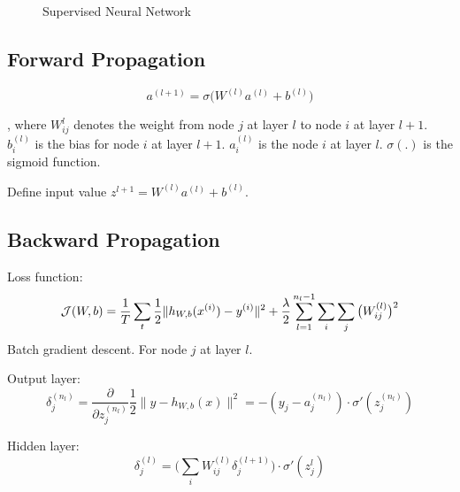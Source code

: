 \documentclass[a4paper]{report}
\begin{document}
\begin{figure}[!htp]
\centering
{}
\caption{Supervised Neural Network}
\label{fig:nnBasic}
\end{figure}

\subsection{Forward Propagation}

$$
a^{(l+1)} = \sigma\Big(W^{(l)}a^{(l)}+b^{(l)}\Big)
$$

, where $W_{ij}^{l}$ denotes the weight from node $j$ at layer $l$ to node $i$ at layer $l+1$. $b_i^{(l)}$ is the bias for node $i$ at layer $l+1$. $a_i^{(l)}$ is the node $i$ at layer $l$. $\sigma(.)$ is the sigmoid function. 

Define input value $z^{l+1} = W^{(l)}a^{(l)}+b^{(l)}$.

\subsection{Backward Propagation}
Loss function:
\begin{align*}
\mathcal{J}(W,b) = \frac{1}{T} \sum_{t} \frac{1}{2} \| h_{W,b}(x^{(i)})-y^{(i)}\|^2+\frac{\lambda}{2} \sum_{l=1}^{n_l-1} \sum_i \sum_j \big(W_{ij}^{(l)}\big)^2
\end{align*}
Batch gradient descent. For node $j$ at layer $l$. 

Output layer:
$$
\delta_j^{(n_l)} = \frac{\partial}{\partial z_j^{(n_l)}} \frac{1}{2} \| y-h_{W, b}(x)\|^2 = -(y_j - a_j^{(n_l)}) \cdot \sigma'(z_j^{(n_l)})
$$

Hidden layer:
$$
\delta_j^{(l)} = \Big(\sum_i W_{ij}^{(l)} \delta_j^{(l+1)}\Big) \cdot \sigma'(z_j^{l})
$$
\end{document}

